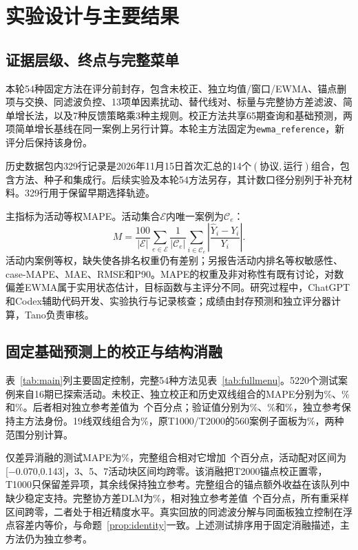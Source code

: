 \documentclass[preprint,12pt]{elsarticle}
\begin{document}
\section{实验设计与主要结果}
\subsection{证据层级、终点与完整菜单}
本轮54种固定方法在评分前封存，包含未校正、独立均值/窗口/EWMA、锚点删项与交换、同滤波负控、13项单因素扰动、替代线对、标量与完整协方差滤波、简单增长法，以及7种反馈策略乘3种主规则。校正方法共享65期查询和基础预测，两项简单增长基线在同一案例上另行计算。本轮主方法固定为\texttt{ewma\_reference}，新评分后保持该身份。

历史数据包内329行记录是2026年11月15日首次汇总的14个\((\text{协议},\text{运行})\)组合，包含方法、种子和集成行。后续实验及本轮54方法另存，其计数口径分别列于补充材料。329行用于保留早期选择轨迹。

主指标为活动等权MAPE。活动集合\(\mathcal E\)内唯一案例为\(\mathcal C_e\)：
\begin{equation}\label{eq:metric}
M=\frac{100}{|\mathcal E|}\sum_{e\in\mathcal E}\frac{1}{|\mathcal C_e|}\sum_{i\in\mathcal C_e}\left|\frac{\widehat Y_i-Y_i}{Y_i}\right|.
\end{equation}
活动内案例等权，缺失使各排名权重仍有差别；另报告活动内排名等权敏感性、case-MAPE、MAE、RMSE和P90。MAPE的权重及非对称性有既有讨论\citep{hyndman2006metrics,demyttenaere2016mape}，对数偏差EWMA属于实用状态估计，目标函数与主评分不同。研究过程中，ChatGPT和Codex辅助代码开发、实验执行与记录核查；成绩由封存预测和独立评分器计算，Tano负责审核。

\subsection{固定基础预测上的校正与结构消融}
表~\ref{tab:main}列主要固定控制，完整54种方法见表~\ref{tab:fullmenu}。5220个测试案例来自16期已探索活动。未校正、独立校正和历史双线组合的MAPE分别为\BaseTest\%、\EwmaTest\%和\PairTest\%。后者相对独立参考差值为\PairDelta\ 个百分点；验证值分别为\BaseVal\%、\EwmaVal\%和\PairVal\%，独立参考保持主方法身份。19线双线组合为\PairTest\%，原T1000/T2000的560案例子面板为\PairTwoTest\%，两种范围分别计算。


仅差异消融的测试MAPE为\DifferenceTest\%，完整组合相对它增加\PairAnchorIncrement\ 个百分点，活动配对区间为[−0.070,0.143]，3、5、7活动块区间均跨零。该消融把T2000锚点校正置零，T1000只保留差异项，其余线保持独立参考。完整组合的锚点额外收益在该队列中缺少稳定支持。完整协方差DLM为\DlmTest\%，相对独立参考差值\DlmDelta\ 个百分点，所有重采样区间跨零，二者处于相近精度水平。真实回放的同滤波分解与同面板独立控制在浮点容差内等价，与命题~\ref{prop:identity}一致。上述测试排序用于固定消融描述，主方法仍为独立参考。
\end{document}
